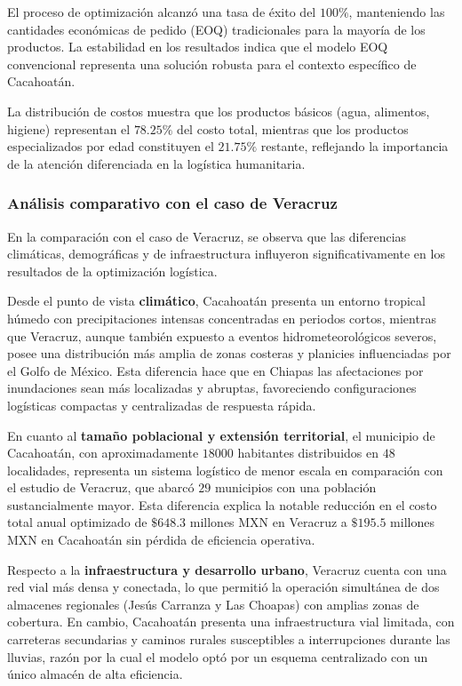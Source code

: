 \documentclass[
  spanish,
  us-letterpaper,
]{scrreprt}
\numberwithin{equation}{section}
\begin{document}
El proceso de optimización alcanzó una tasa de éxito del \(100\%\),
manteniendo las cantidades económicas de pedido (EOQ) tradicionales para
la mayoría de los productos. La estabilidad en los resultados indica que
el modelo EOQ convencional representa una solución robusta para el
contexto específico de Cacahoatán.

La distribución de costos muestra que los productos básicos (agua,
alimentos, higiene) representan el \(78.25\%\) del costo total, mientras
que los productos especializados por edad constituyen el \(21.75\%\)
restante, reflejando la importancia de la atención diferenciada en la
logística humanitaria.

\subsubsection{Análisis comparativo con el caso de
Veracruz}\label{anuxe1lisis-comparativo-con-el-caso-de-veracruz}

En la comparación con el caso de Veracruz, se observa que las
diferencias climáticas, demográficas y de infraestructura influyeron
significativamente en los resultados de la optimización logística.

Desde el punto de vista \textbf{climático}, Cacahoatán presenta un
entorno tropical húmedo con precipitaciones intensas concentradas en
periodos cortos, mientras que Veracruz, aunque también expuesto a
eventos hidrometeorológicos severos, posee una distribución más amplia
de zonas costeras y planicies influenciadas por el Golfo de México. Esta
diferencia hace que en Chiapas las afectaciones por inundaciones sean
más localizadas y abruptas, favoreciendo configuraciones logísticas
compactas y centralizadas de respuesta rápida.

En cuanto al \textbf{tamaño poblacional y extensión territorial}, el
municipio de Cacahoatán, con aproximadamente \(18 000\) habitantes
distribuidos en \(48\) localidades, representa un sistema logístico de
menor escala en comparación con el estudio de Veracruz, que abarcó
\(29\) municipios con una población sustancialmente mayor. Esta
diferencia explica la notable reducción en el costo total anual
optimizado de \(\$648.3\) millones MXN en Veracruz a \(\$195.5\)
millones MXN en Cacahoatán sin pérdida de eficiencia operativa.

Respecto a la \textbf{infraestructura y desarrollo urbano}, Veracruz
cuenta con una red vial más densa y conectada, lo que permitió la
operación simultánea de dos almacenes regionales (Jesús Carranza y Las
Choapas) con amplias zonas de cobertura. En cambio, Cacahoatán presenta
una infraestructura vial limitada, con carreteras secundarias y caminos
rurales susceptibles a interrupciones durante las lluvias, razón por la
cual el modelo optó por un esquema centralizado con un único almacén de
alta eficiencia.
\end{document}

